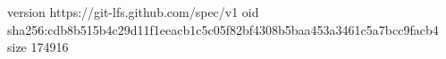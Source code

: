 version https://git-lfs.github.com/spec/v1
oid sha256:cdb8b515b4c29d11f1eeacb1c5c05f82bf4308b5baa453a3461c5a7bcc9facb4
size 174916
